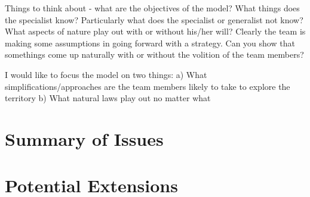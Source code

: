 \documentclass[12pt]{article}
\begin{document}
Things to think about - what are the objectives of the model? What things does the specialist know? Particularly what does the specialist or generalist not know? What aspects of nature play out with or without his/her will? Clearly the team is making some assumptions in going forward with a strategy. Can you show that somethings come up naturally with or without the volition of the team members?

I would like to focus the model on two things:
a) What simplifications/approaches are the team members likely to take to explore the territory
b) What natural laws play out no matter what

\section{Summary of Issues}

\section{Potential Extensions}


 

\end{document}
